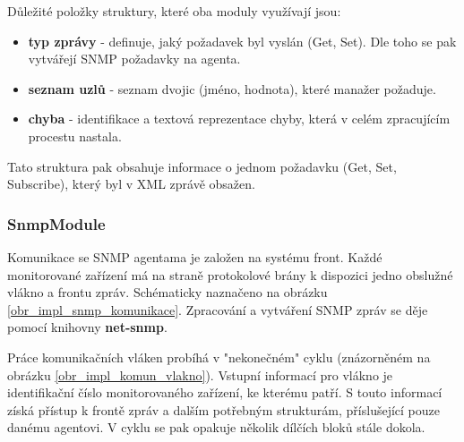 Důležité položky struktury, které oba moduly využívají jsou:
\begin{itemize}
	\item \textbf{typ zprávy} - definuje, jaký požadavek byl vyslán (Get, Set). Dle toho se pak vytvářejí SNMP požadavky na agenta.
	\item \textbf{seznam uzlů} - seznam dvojic (jméno, hodnota), které manažer požaduje.
	\item \textbf{chyba} - identifikace a textová reprezentace chyby, která v celém zpracujícím procestu nastala.
\end{itemize}

Tato struktura pak obsahuje informace o jednom požadavku (Get, Set, Subscribe), který byl v XML zprávě obsažen. 


\subsubsection*{SnmpModule}
Komunikace se SNMP agentama je založen na systému front. Každé monitorované zařízení má na straně protokolové brány k dispozici jedno obslužné vlákno
a frontu zpráv. Schématicky naznačeno na obrázku \ref{obr_impl_snmp_komunikace}. Zpracování a vytváření SNMP zpráv se děje pomocí knihovny \textbf{net-snmp}.

Práce komunikačních vláken probíhá v "nekonečném" cyklu (znázorněném na obrázku \ref{obr_impl_komun_vlakno}). Vstupní informací pro vlákno je identifikační
číslo monitorovaného zařízení, ke kterému patří. S touto informací získá přístup k frontě zpráv a dalším potřebným strukturám, příslušející pouze danému agentovi.
V cyklu se pak opakuje několik dílčích bloků stále dokola.

